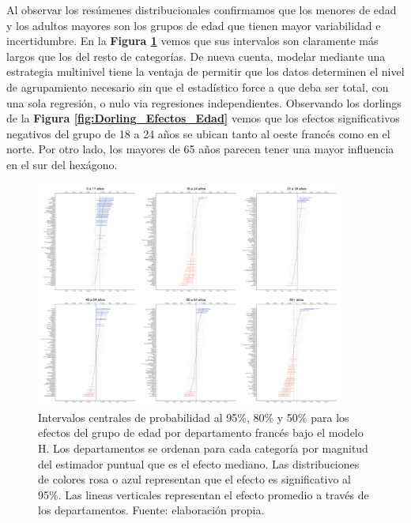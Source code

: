 Al observar los resúmenes distribucionales confirmamos que los menores de edad y los adultos mayores son los grupos de edad que tienen mayor variabilidad e incertidumbre. En la \textbf{Figura \ref{fig:Efectos_Edad}} vemos que sus intervalos son claramente más largos que los del resto de categorías. De nueva cuenta, modelar mediante una estrategia multinivel tiene la ventaja de permitir que los datos determinen el nivel de agrupamiento necesario sin que el estadístico force a que deba ser total, con una sola regresión, o nulo via regresiones independientes. Observando los dorlings de la \textbf{Figura \ref{fig:Dorling_Efectos_Edad}} vemos que los efectos significativos negativos del grupo de 18 a 24 años se ubican tanto al oeste francés como en el norte. Por otro lado, los mayores de 65 años parecen tener una mayor influencia en el sur del hexágono.

\begin{figure}
	\centering
	\includegraphics[width = 0.9\textwidth]{Figs/Efectos/Efectos_Edad_Modelo_H}
	\caption{Intervalos centrales de probabilidad al 95\%, 80\% y 50\% para los efectos del grupo de edad por departamento francés bajo el modelo H. Los departamentos se ordenan para cada categoría por magnitud del estimador puntual que es el efecto mediano. Las distribuciones de colores rosa o azul representan que el efecto es significativo al 95\%. Las lineas verticales representan el efecto promedio a través de los departamentos. Fuente: elaboración propia.}
	\label{fig:Efectos_Edad}
\end{figure}

